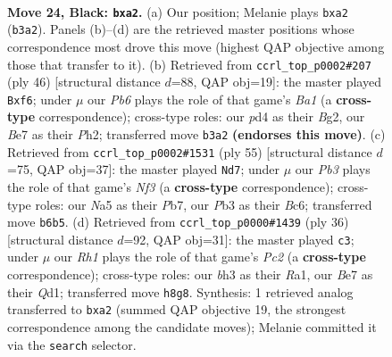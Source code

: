\documentclass[11pt]{article}
\begin{document}
\clearpage

\begin{figure}[p]\centering
\begin{subfigure}{0.46\textwidth}\centering
\resizebox{\linewidth}{!}{%
\newchessgame
\chessboard[
  setfen={rqb1k2r/p3b1pp/1p6/n2p1p2/P2P3P/1p2P1nB/RB1N1PK1/1NQ1R3 b - - 1 24},
  showmover=false,
  pgfstyle=straightmove, color=movearrow, markmove={b3-a2}
]}
\caption{}
\end{subfigure}\hfill
\begin{subfigure}{0.46\textwidth}\centering
\resizebox{\linewidth}{!}{%
\newchessgame
\chessboard[
  setfen={1qrnk2r/p3n1pp/4pb2/1PN2p2/N4P2/PQ1Pp1P1/6BP/B4RK1 w k - 0 24},
  showmover=false,
  pgfstyle=straightmove, color=movearrow, markmove={a1-f6}
]}
\caption{}
\end{subfigure}
\\[4pt]
\begin{subfigure}{0.46\textwidth}\centering
\resizebox{\linewidth}{!}{%
\newchessgame
\chessboard[
  setfen={1br3k1/1p2qpp1/2b2n2/1N6/P1B1p2p/1Q1nP2P/3N1PP1/B2R2K1 b - - 7 28},
  showmover=false,
  pgfstyle=straightmove, color=movearrow, markmove={f6-d7}
]}
\caption{}
\end{subfigure}\hfill
\begin{subfigure}{0.46\textwidth}\centering
\resizebox{\linewidth}{!}{%
\newchessgame
\chessboard[
  setfen={r3k2r/3n1pp1/1qb1p2p/p1bpP3/3N1PPP/4B1K1/1PP5/R2Q1B1R w kq - 2 19},
  showmover=false,
  pgfstyle=straightmove, color=movearrow, markmove={c2-c3}
]}
\caption{}
\end{subfigure}
\caption{\textbf{Move 24, Black: \texttt{bxa2}.} (a) Our position; Melanie plays \texttt{bxa2} (\texttt{b3a2}). Panels (b)--(d) are the retrieved master positions whose correspondence most drove this move (highest QAP objective among those that transfer to it). (b) Retrieved from \texttt{ccrl\_top\_p0002\#207} (ply 46) [structural distance $d$=88, QAP obj=19]: the master played \texttt{Bxf6}; under $\mu$ our \emph{Pb6} plays the role of that game's \emph{Ba1} (a \textbf{cross-type} correspondence); cross-type roles: our \emph{p}d4 as their \emph{B}g2, our \emph{B}e7 as their \emph{P}h2; transferred move \texttt{b3a2} \textbf{(endorses this move)}. (c) Retrieved from \texttt{ccrl\_top\_p0002\#1531} (ply 55) [structural distance $d$=75, QAP obj=37]: the master played \texttt{Nd7}; under $\mu$ our \emph{Pb3} plays the role of that game's \emph{Nf3} (a \textbf{cross-type} correspondence); cross-type roles: our \emph{N}a5 as their \emph{P}b7, our \emph{P}b3 as their \emph{B}c6; transferred move \texttt{b6b5}. (d) Retrieved from \texttt{ccrl\_top\_p0000\#1439} (ply 36) [structural distance $d$=92, QAP obj=31]: the master played \texttt{c3}; under $\mu$ our \emph{Rh1} plays the role of that game's \emph{Pc2} (a \textbf{cross-type} correspondence); cross-type roles: our \emph{b}h3 as their \emph{R}a1, our \emph{B}e7 as their \emph{Q}d1; transferred move \texttt{h8g8}. Synthesis: 1 retrieved analog transferred to \texttt{bxa2} (summed QAP objective 19, the strongest correspondence among the candidate moves); Melanie committed it via the \texttt{search} selector.}
\label{fig:thought-m47}
\end{figure}
\end{document}
